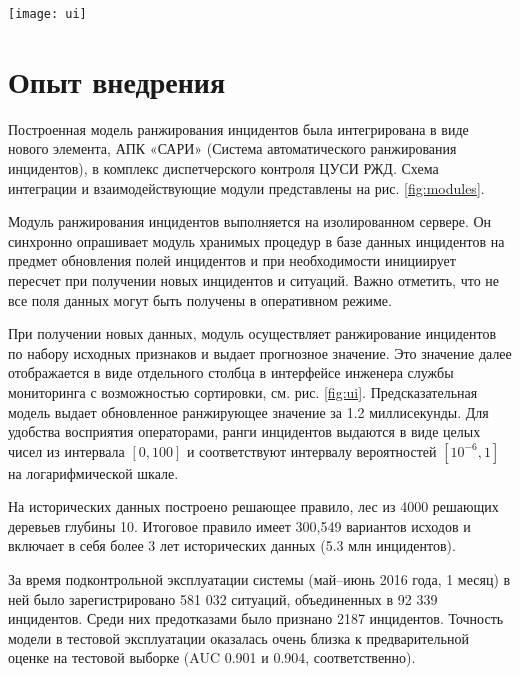 \begin{figure*}[thb] 
\centering
\texttt{[image: ui]}
\caption{Отображение результатов ранжирования в пользовательском интерфейсе инженера службы мониторинга.}
\centering
\label{fig:ui}
\end{figure*}


\section{Опыт внедрения}
Построенная модель ранжирования инцидентов была интегрирована в виде нового элемента, АПК «САРИ» (Система автоматического ранжирования инцидентов), в комплекс диспетчерского контроля ЦУСИ РЖД.   Схема интеграции и взаимодействующие модули представлены на рис. \ref{fig:modules}. 

Модуль ранжирования инцидентов выполняется на изолированном сервере. Он синхронно опрашивает модуль хранимых процедур в базе данных инцидентов на предмет обновления полей инцидентов и при необходимости инициирует пересчет при получении новых инцидентов и ситуаций. Важно отметить, что не все поля данных могут быть получены в оперативном режиме.

При получении новых данных, модуль осуществляет ранжирование инцидентов по набору исходных признаков и выдает прогнозное значение. Это значение далее отображается в виде отдельного столбца в интерфейсе инженера службы мониторинга с возможностью сортировки, см. рис. \ref{fig:ui}. Предсказательная модель выдает обновленное ранжирующее значение за 1.2 миллисекунды. Для удобства восприятия операторами, ранги инцидентов выдаются в виде целых чисел из интервала $[0,100]$ и соответствуют интервалу вероятностей $[10^{-6},1]$ на логарифмической шкале.


На исторических данных построено решающее правило, лес из 4000 решающих деревьев глубины 10.  Итоговое правило имеет 300,549 вариантов исходов и включает в себя более 3 лет исторических данных (5.3 млн инцидентов).

За время подконтрольной эксплуатации системы (май--июнь 2016 года, 1 месяц) в ней было зарегистрировано 581 032 ситуаций, объединенных в 92 339 инцидентов. Среди них предотказами было признано 2187 инцидентов. %
Точность модели в тестовой эксплуатации оказалась очень близка к предварительной оценке на тестовой выборке (AUC 0.901 и 0.904, соответственно).


